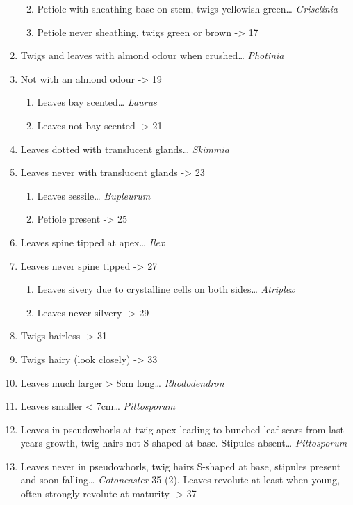 \documentclass[openany]{book}
\providecommand{\tightlist}{%
  \setlength{\itemsep}{0pt}\setlength{\parskip}{0pt}}
\begin{document}
\begin{enumerate}
  \begin{enumerate}
  \def\labelenumii{\arabic{enumii}.}
  \setcounter{enumii}{14}
  \tightlist
  \item
    Petiole with sheathing base on stem, twigs yellowish green\ldots{}
    \emph{Griselinia}
  \item
    Petiole never sheathing, twigs green or brown -\textgreater{} 17
  \end{enumerate}
\item
  Twigs and leaves with almond odour when crushed\ldots{}
  \emph{Photinia}
\item
  Not with an almond odour -\textgreater{} 19

  \begin{enumerate}
  \def\labelenumii{\arabic{enumii}.}
  \setcounter{enumii}{18}
  \tightlist
  \item
    Leaves bay scented\ldots{} \emph{Laurus}
  \item
    Leaves not bay scented -\textgreater{} 21
  \end{enumerate}
\item
  Leaves dotted with translucent glands\ldots{} \emph{Skimmia}
\item
  Leaves never with translucent glands -\textgreater{} 23

  \begin{enumerate}
  \def\labelenumii{\arabic{enumii}.}
  \setcounter{enumii}{22}
  \tightlist
  \item
    Leaves sessile\ldots{} \emph{Bupleurum}
  \item
    Petiole present -\textgreater{} 25
  \end{enumerate}
\item
  Leaves spine tipped at apex\ldots{} \emph{Ilex}
\item
  Leaves never spine tipped -\textgreater{} 27

  \begin{enumerate}
  \def\labelenumii{\arabic{enumii}.}
  \setcounter{enumii}{26}
  \tightlist
  \item
    Leaves sivery due to crystalline cells on both sides\ldots{}
    \emph{Atriplex}
  \item
    Leaves never silvery -\textgreater{} 29
  \end{enumerate}
\item
  Twigs hairless -\textgreater{} 31
\item
  Twigs hairy (look closely) -\textgreater{} 33
\item
  Leaves much larger \textgreater{} 8cm long\ldots{} \emph{Rhododendron}
\item
  Leaves smaller \textless{} 7cm\ldots{} \emph{Pittosporum}
\item
  Leaves in pseudowhorls at twig apex leading to bunched leaf scars from
  last years growth, twig hairs not S-shaped at base. Stipules
  absent\ldots{} \emph{Pittosporum}
\item
  Leaves never in pseudowhorls, twig hairs S-shaped at base, stipules
  present and soon falling\ldots{} \emph{Cotoneaster} 35 (2). Leaves
  revolute at least when young, often strongly revolute at maturity
  -\textgreater{} 37


\end{enumerate}
\end{document}
